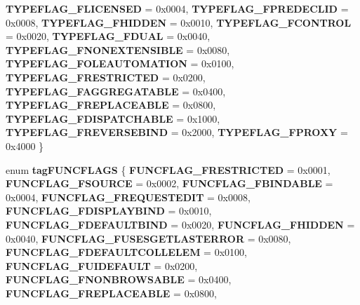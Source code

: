 \begin{DoxyCompactItemize}
{\bfseries T\+Y\+P\+E\+F\+L\+A\+G\+\_\+\+F\+L\+I\+C\+E\+N\+S\+ED} = 0x0004, 
{\bfseries T\+Y\+P\+E\+F\+L\+A\+G\+\_\+\+F\+P\+R\+E\+D\+E\+C\+L\+ID} = 0x0008, 
\newline
{\bfseries T\+Y\+P\+E\+F\+L\+A\+G\+\_\+\+F\+H\+I\+D\+D\+EN} = 0x0010, 
{\bfseries T\+Y\+P\+E\+F\+L\+A\+G\+\_\+\+F\+C\+O\+N\+T\+R\+OL} = 0x0020, 
{\bfseries T\+Y\+P\+E\+F\+L\+A\+G\+\_\+\+F\+D\+U\+AL} = 0x0040, 
{\bfseries T\+Y\+P\+E\+F\+L\+A\+G\+\_\+\+F\+N\+O\+N\+E\+X\+T\+E\+N\+S\+I\+B\+LE} = 0x0080, 
\newline
{\bfseries T\+Y\+P\+E\+F\+L\+A\+G\+\_\+\+F\+O\+L\+E\+A\+U\+T\+O\+M\+A\+T\+I\+ON} = 0x0100, 
{\bfseries T\+Y\+P\+E\+F\+L\+A\+G\+\_\+\+F\+R\+E\+S\+T\+R\+I\+C\+T\+ED} = 0x0200, 
{\bfseries T\+Y\+P\+E\+F\+L\+A\+G\+\_\+\+F\+A\+G\+G\+R\+E\+G\+A\+T\+A\+B\+LE} = 0x0400, 
{\bfseries T\+Y\+P\+E\+F\+L\+A\+G\+\_\+\+F\+R\+E\+P\+L\+A\+C\+E\+A\+B\+LE} = 0x0800, 
\newline
{\bfseries T\+Y\+P\+E\+F\+L\+A\+G\+\_\+\+F\+D\+I\+S\+P\+A\+T\+C\+H\+A\+B\+LE} = 0x1000, 
{\bfseries T\+Y\+P\+E\+F\+L\+A\+G\+\_\+\+F\+R\+E\+V\+E\+R\+S\+E\+B\+I\+ND} = 0x2000, 
{\bfseries T\+Y\+P\+E\+F\+L\+A\+G\+\_\+\+F\+P\+R\+O\+XY} = 0x4000
 \}
\item 
\mbox{\label{interface_i_ole_automation_types_adc93f69280f19cb4b488db9cf0d7f4cc}} 
enum {\bfseries tag\+F\+U\+N\+C\+F\+L\+A\+GS} \{ \newline
{\bfseries F\+U\+N\+C\+F\+L\+A\+G\+\_\+\+F\+R\+E\+S\+T\+R\+I\+C\+T\+ED} = 0x0001, 
{\bfseries F\+U\+N\+C\+F\+L\+A\+G\+\_\+\+F\+S\+O\+U\+R\+CE} = 0x0002, 
{\bfseries F\+U\+N\+C\+F\+L\+A\+G\+\_\+\+F\+B\+I\+N\+D\+A\+B\+LE} = 0x0004, 
{\bfseries F\+U\+N\+C\+F\+L\+A\+G\+\_\+\+F\+R\+E\+Q\+U\+E\+S\+T\+E\+D\+IT} = 0x0008, 
\newline
{\bfseries F\+U\+N\+C\+F\+L\+A\+G\+\_\+\+F\+D\+I\+S\+P\+L\+A\+Y\+B\+I\+ND} = 0x0010, 
{\bfseries F\+U\+N\+C\+F\+L\+A\+G\+\_\+\+F\+D\+E\+F\+A\+U\+L\+T\+B\+I\+ND} = 0x0020, 
{\bfseries F\+U\+N\+C\+F\+L\+A\+G\+\_\+\+F\+H\+I\+D\+D\+EN} = 0x0040, 
{\bfseries F\+U\+N\+C\+F\+L\+A\+G\+\_\+\+F\+U\+S\+E\+S\+G\+E\+T\+L\+A\+S\+T\+E\+R\+R\+OR} = 0x0080, 
\newline
{\bfseries F\+U\+N\+C\+F\+L\+A\+G\+\_\+\+F\+D\+E\+F\+A\+U\+L\+T\+C\+O\+L\+L\+E\+L\+EM} = 0x0100, 
{\bfseries F\+U\+N\+C\+F\+L\+A\+G\+\_\+\+F\+U\+I\+D\+E\+F\+A\+U\+LT} = 0x0200, 
{\bfseries F\+U\+N\+C\+F\+L\+A\+G\+\_\+\+F\+N\+O\+N\+B\+R\+O\+W\+S\+A\+B\+LE} = 0x0400, 
{\bfseries F\+U\+N\+C\+F\+L\+A\+G\+\_\+\+F\+R\+E\+P\+L\+A\+C\+E\+A\+B\+LE} = 0x0800, 

\end{DoxyCompactItemize}
